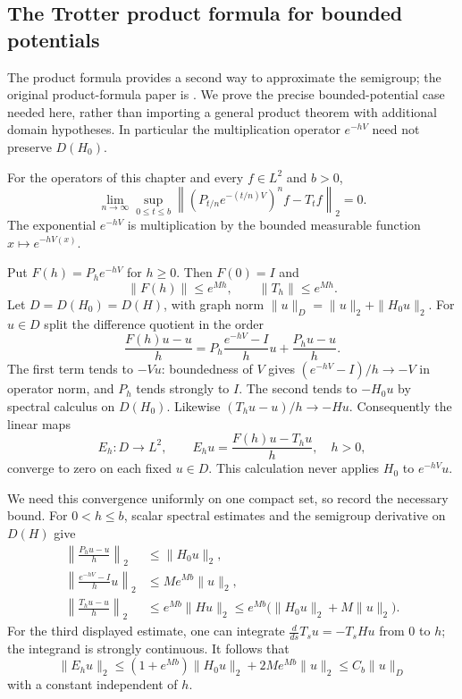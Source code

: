 \subsection{The Trotter product formula for bounded potentials}
The product formula provides a second way to approximate the semigroup;
the original product-formula paper is \textcite{Trotter1959Product}.
We prove the precise bounded-potential case needed here, rather than
importing a general product theorem with additional domain hypotheses.
In particular the multiplication operator $e^{-hV}$ need not preserve
$D(H_0)$.

\begin{theorem}
\label{thm:bounded_potential_trotter}
For the operators of this chapter and every $f\in L^2$ and $b>0$,
\[
\lim_{n\to\infty}\sup_{0\leq t\leq b}
\left\|\left(P_{t/n}e^{-(t/n)V}\right)^n f-T_tf\right\|_2=0.
\]
The exponential $e^{-hV}$ is multiplication by the bounded measurable
function $x\mapsto e^{-hV(x)}$.
\end{theorem}
\Proof
Put $F(h)=P_he^{-hV}$ for $h\geq0$. Then $F(0)=I$ and
\[
\|F(h)\|\leq e^{Mh},\qquad \|T_h\|\leq e^{Mh}.
\]
Let $D=D(H_0)=D(H)$, with graph norm
$\|u\|_D=\|u\|_2+\|H_0u\|_2$.
For $u\in D$ split the difference quotient in the order
\[
\frac{F(h)u-u}{h}
 =P_h\frac{e^{-hV}-I}{h}u+\frac{P_hu-u}{h}.
\]
The first term tends to $-Vu$: boundedness of $V$ gives
$(e^{-hV}-I)/h\to-V$ in operator norm, and $P_h$ tends strongly
to $I$. The second tends to $-H_0u$ by spectral calculus on $D(H_0)$.
Likewise $(T_hu-u)/h\to-Hu$. Consequently the linear maps
\[
E_h:D\longrightarrow L^2,\qquad E_hu=\frac{F(h)u-T_hu}{h},
\quad h>0,
\]
converge to zero on each fixed $u\in D$. This calculation never
applies $H_0$ to $e^{-hV}u$.

We need this convergence uniformly on one compact set, so record the
necessary bound. For $0<h\leq b$, scalar spectral estimates and
the semigroup derivative on $D(H)$ give
\[
\begin{split}
\left\|\frac{P_hu-u}{h}\right\|_2&\leq\|H_0u\|_2,\\
\left\|\frac{e^{-hV}-I}{h}u\right\|_2
 &\leq M e^{Mb}\|u\|_2,\\
\left\|\frac{T_hu-u}{h}\right\|_2
 &\leq e^{Mb}\|Hu\|_2
 \leq e^{Mb}\bigl(\|H_0u\|_2+M\|u\|_2\bigr).
\end{split}
\]
For the third displayed estimate, one can integrate
$\frac{d}{ds}T_su=-T_sHu$ from $0$ to $h$; the integrand is
strongly continuous. It follows that
\[
\|E_hu\|_2
\leq(1+e^{Mb})\|H_0u\|_2+2Me^{Mb}\|u\|_2
\leq C_b\|u\|_D
\]
with a constant independent of $h$.


